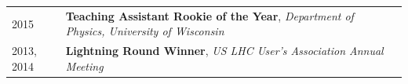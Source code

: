 \documentclass{letter}
\begin{document}
\vspace{-10pt}



\begin{flushleft}
  \Large{\textsc{\textbf{\color{Maroon}{Awards}}}}
  \vspace{1pt} %
\end{flushleft}

\begin{tabular}{p{}p{}}
  2015
  &
  \textbf{Teaching Assistant Rookie of the Year}, \textit{Department of Physics, University of Wisconsin} 
  \\
  2013, 2014
  & 
  \textbf{Lightning Round Winner}, \textit{US LHC User's Association Annual Meeting}
\\
\end{tabular}
\end{document}
